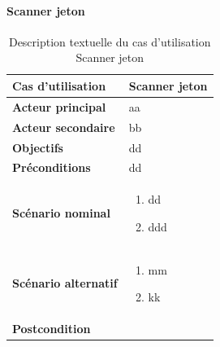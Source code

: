         \paragraph[Scanner jeton]{Scanner jeton}
        \begin{longtable}{p{4cm} p{9cm}}
            \caption{Description textuelle du cas d’utilisation Scanner jeton}
            \label{table:usecaseScannerJ}
            \\\hline\hline
                \textbf{Cas d’utilisation} & \textbf{Scanner jeton}
            \\\hline\hline
                    \textbf{Acteur principal} & aa
                \\
                    \textbf{Acteur secondaire} & bb
                \\
                    \textbf{Objectifs} & dd
                \\
                    \textbf{Préconditions} & dd
                \\
                \textbf{Scénario nominal} &
                    \begin{enumerate}[leftmargin=*]
                        \item dd
                        \item ddd
                    \end{enumerate}
                \\
                \textbf{Scénario alternatif} &
                    \begin{enumerate}[leftmargin=*]
                        \item mm
                        \item kk
                    \end{enumerate}
                \\
                \textbf{Postcondition}
            \\\bottomrule
        \end{longtable}

